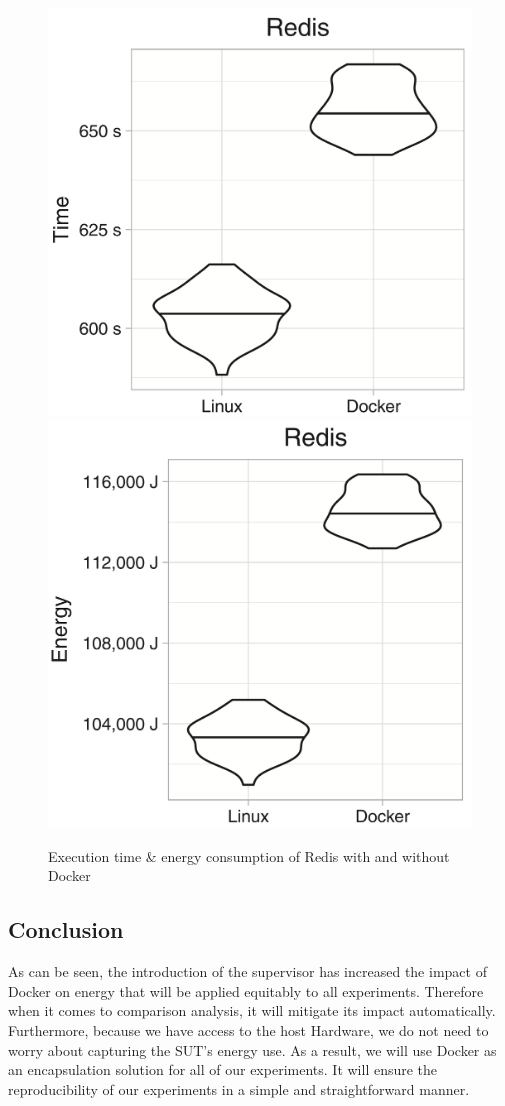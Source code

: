\begin{figure}[!bht]
    \includegraphics[width=.5\linewidth]{imgs/docker_vs_vm_energy_paper/reddis_time}
    \includegraphics[width=.5\linewidth]{imgs/docker_vs_vm_energy_paper/reddis_energy}
    \caption{Execution time \& energy consumption of Redis with and without Docker~\cite{eddie_antonio_santos_how}}\label{fig:docker_reddis}
\end{figure}


\subsection{Conclusion}
As can be seen, the introduction of the supervisor has increased the impact of Docker on energy that will be applied equitably to all experiments.
Therefore when it comes to comparison analysis, it will mitigate its impact automatically.
Furthermore, because we have access to the host Hardware, we do not need to worry about capturing the SUT's energy use.
As a result, we will use Docker as an encapsulation solution for all of our experiments.
It will ensure the reproducibility of our experiments in a simple and straightforward manner.
\clearpage
